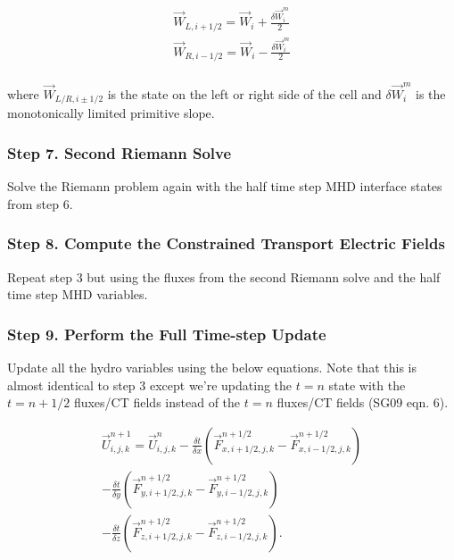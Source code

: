     \begin{equation}
        \begin{aligned}
            \vec{W}_{L, i+1/2} = \vec{W}_{i} + \frac{\delta \vec{W}_{i}^m}{2} \\
            \vec{W}_{R, i-1/2} = \vec{W}_{i} - \frac{\delta \vec{W}_{i}^m}{2} \\
        \end{aligned}
    \end{equation}

    where $ \vec{W}_{L/R, i\pm1/2} $ is the state on the left or right side
    of the cell and $ \delta \vec{W}_{i}^m $ is the monotonically limited
    primitive slope.

\subsubsection{Step 7. Second Riemann Solve}
\label{vlct:2nd-riemann-solve}

Solve the Riemann problem again with the half time step MHD interface states from step 6.

\subsubsection{Step 8. Compute the Constrained Transport Electric Fields}
\label{vlct:2nd-emf}

Repeat step 3 but using the fluxes from the second Riemann solve and the half time step MHD variables.

\subsubsection{Step 9. Perform the Full Time-step Update}
\label{vlct:full-dt-update}

Update all the hydro variables using the below equations. Note that this is almost identical to step 3 except we're updating the $ t = n $ state with the $ t=n+1/2 $ fluxes/CT fields instead of the $ t=n $ fluxes/CT fields (SG09 eqn. 6).

\begin{equation}
    \begin{aligned}
        \vec{U}^{n+1}_{i,j,k} = \vec{U}^{n}_{i,j,k}
        - \frac{\delta t}{\delta x} \left( \vec{F}^{n+1/2}_{x,i+1/2,j,k} - \vec{F}^{n+1/2}_{x,i-1/2,j,k} \right) \\
        - \frac{\delta t}{\delta y} \left( \vec{F}^{n+1/2}_{y,i+1/2,j,k} - \vec{F}^{n+1/2}_{y,i-1/2,j,k} \right) \\
        - \frac{\delta t}{\delta z} \left( \vec{F}^{n+1/2}_{z,i+1/2,j,k} - \vec{F}^{n+1/2}_{z,i-1/2,j,k} \right).
    \end{aligned}
\end{equation}

